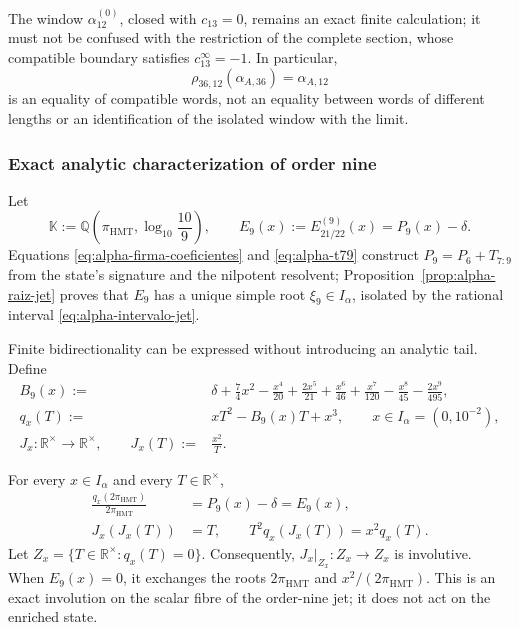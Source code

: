 The window \(\alpha_{12}^{(0)}\), closed with \(c_{13}=0\), remains an
exact finite calculation; it must not be confused with the restriction of
the complete section, whose compatible boundary satisfies \(c_{13}^{\infty}=-1\).
In particular,
\begin{equation}
 \rho_{36,12}(\alpha_{A,36})=\alpha_{A,12}
 \label{eq:alpha-rho-36-12-proyectiva}
\end{equation}
is an equality of compatible words, not an equality between words of
different lengths or an identification of the isolated window with the
limit.

\subsubsection{Exact analytic characterization of order nine}

Let
\[
 \mathbb K:=\mathbb Q\!\left(\pi_{\mathrm{HMT}},
                  \log_{10}\frac{10}{9}\right),
 \qquad
 E_9(x):=E_{21/22}^{(9)}(x)=P_9(x)-\delta .
\]
Equations \eqref{eq:alpha-firma-coeficientes} and
\eqref{eq:alpha-t79} construct \(P_9=P_6+T_{7:9}\) from the state's
signature and the nilpotent resolvent;
Proposition~\ref{prop:alpha-raiz-jet} proves that \(E_9\) has a unique
simple root \(\xi_9\in I_\alpha\), isolated by the rational interval
\eqref{eq:alpha-intervalo-jet}.

Finite bidirectionality can be expressed without introducing an
analytic tail. Define
\begin{align}
 B_9(x):={}&\delta+\frac74x^2-\frac{x^4}{20}
 +\frac{2x^5}{21}+\frac{x^6}{46}+\frac{x^7}{120}
 -\frac{x^8}{45}-\frac{2x^9}{495},
 \label{eq:alpha-b9-finito}\\
 q_x(T):={}&xT^2-B_9(x)T+x^3,\qquad x\in I_\alpha=(0,10^{-2}),
 \label{eq:alpha-q-involucion-finita}\\
 J_x:{\mathbb R}^{\times}\longrightarrow{\mathbb R}^{\times},
 \qquad J_x(T):={}&\frac{x^2}{T}.
\end{align}

\begin{proposition}
\label{prop:alpha-involucion-finita-exacta}
For every \(x\in I_\alpha\) and every \(T\in\mathbb R^\times\),
\begin{align}
 \frac{q_x(2\pi_{\mathrm{HMT}})}{2\pi_{\mathrm{HMT}}}
 &=P_9(x)-\delta=E_9(x),
 \label{eq:alpha-q-equivale-p9}\\
 J_x(J_x(T))&=T,
 \qquad
 T^2q_x(J_x(T))=x^2q_x(T).
 \label{eq:alpha-j-involucion-exacta}
\end{align}
Let \(Z_x=\{T\in\mathbb R^\times:q_x(T)=0\}\). Consequently,
\(J_x|_{Z_x}:Z_x\to Z_x\) is involutive. When \(E_9(x)=0\),
it exchanges the roots \(2\pi_{\mathrm{HMT}}\) and
\(x^2/(2\pi_{\mathrm{HMT}})\). This is an exact involution on the scalar
fibre of the order-nine jet; it does not act on the enriched state.
\end{proposition}

